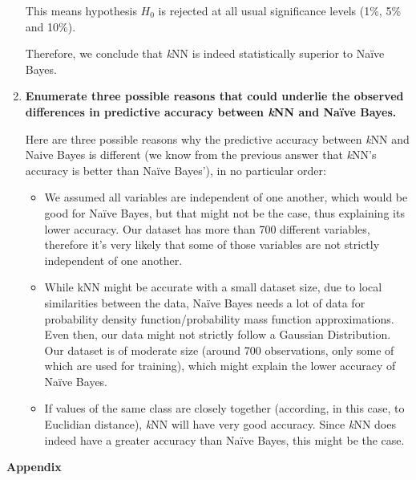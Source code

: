 \documentclass[12pt]{article}
\begin{document}
\begin{enumerate}[leftmargin=\labelsep,resume]
          This means hypothesis $H_0$ is rejected at all usual significance levels
          (1\%, 5\% and 10\%).

          Therefore, we conclude that \textit{k}NN is indeed statistically superior
          to Naïve Bayes.

    \item {\bfseries
          Enumerate three possible reasons that could underlie the observed differences in predictive accuracy between \textit{k}NN and Naïve
          Bayes.
          }

          Here are three possible reasons why the predictive accuracy between \textit{k}NN
          and Naive Bayes is different (we know from the previous answer
          that \textit{k}NN's accuracy is better than Naïve Bayes'), in no particular order:

          \begin{itemize}
              \item We assumed all variables are independent of one another,
                    which would be good for Naïve Bayes, but that might not
                    be the case, thus explaining its lower accuracy.
                    Our dataset has more than 700 different variables, therefore
                    it's very likely that some of those variables are not strictly
                    independent of one another.
              \item While kNN might be accurate with a small dataset size, due to
                    local similarities between the data, Naïve Bayes needs a lot
                    of data for probability density function/probability
                    mass function approximations.
                    Even then, our data might not strictly follow a Gaussian Distribution.
                    Our dataset is of moderate size (around 700 observations, only
                    some of which are used for training), which might explain
                    the lower accuracy of Naïve Bayes.
              \item If values of the same class are closely together
                    (according, in this case, to Euclidian distance),
                    \textit{k}NN will have very good accuracy.
                    Since \textit{k}NN does indeed have a greater accuracy than
                    Naïve Bayes, this might be the case.
          \end{itemize}
\end{enumerate}

\pagebreak

\center\large{\textbf{Appendix}\vskip 0.3cm}




\end{document}
